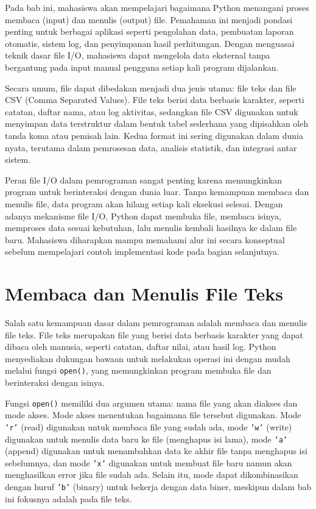 Pada bab ini, mahasiswa akan mempelajari bagaimana Python menangani proses membaca (input) dan menulis (output) file. Pemahaman ini menjadi pondasi penting untuk berbagai aplikasi seperti pengolahan data, pembuatan laporan otomatis, sistem log, dan penyimpanan hasil perhitungan. Dengan menguasai teknik dasar file I/O, mahasiswa dapat mengelola data eksternal tanpa bergantung pada input manual pengguna setiap kali program dijalankan.

Secara umum, file dapat dibedakan menjadi dua jenis utama: file teks dan file CSV (Comma Separated Values). File teks berisi data berbasis karakter, seperti catatan, daftar nama, atau log aktivitas, sedangkan file CSV digunakan untuk menyimpan data terstruktur dalam bentuk tabel sederhana yang dipisahkan oleh tanda koma atau pemisah lain. Kedua format ini sering digunakan dalam dunia nyata, terutama dalam pemrosesan data, analisis statistik, dan integrasi antar sistem.

Peran file I/O dalam pemrograman sangat penting karena memungkinkan program untuk berinteraksi dengan dunia luar. Tanpa kemampuan membaca dan menulis file, data program akan hilang setiap kali eksekusi selesai. Dengan adanya mekanisme file I/O, Python dapat membuka file, membaca isinya, memproses data sesuai kebutuhan, lalu menulis kembali hasilnya ke dalam file baru. Mahasiswa diharapkan mampu memahami alur ini secara konseptual sebelum mempelajari contoh implementasi kode pada bagian selanjutnya.


\section{Membaca dan Menulis File Teks}

Salah satu kemampuan dasar dalam pemrograman adalah membaca dan menulis file teks. File teks merupakan file yang berisi data berbasis karakter yang dapat dibaca oleh manusia, seperti catatan, daftar nilai, atau hasil log. Python menyediakan dukungan bawaan untuk melakukan operasi ini dengan mudah melalui fungsi \texttt{open()}, yang memungkinkan program membuka file dan berinteraksi dengan isinya.

Fungsi \texttt{open()} memiliki dua argumen utama: nama file yang akan diakses dan mode akses. Mode akses menentukan bagaimana file tersebut digunakan. Mode \texttt{'r'} (read) digunakan untuk membaca file yang sudah ada, mode \texttt{'w'} (write) digunakan untuk menulis data baru ke file (menghapus isi lama), mode \texttt{'a'} (append) digunakan untuk menambahkan data ke akhir file tanpa menghapus isi sebelumnya, dan mode \texttt{'x'} digunakan untuk membuat file baru namun akan menghasilkan error jika file sudah ada. Selain itu, mode dapat dikombinasikan dengan huruf \texttt{'b'} (binary) untuk bekerja dengan data biner, meskipun dalam bab ini fokusnya adalah pada file teks.

